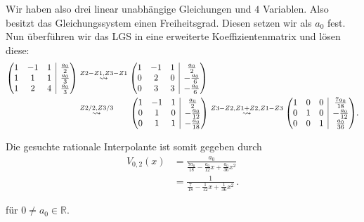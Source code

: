 \documentclass[a4paper]{article}
\makeatletter
\newcommand{\R}{\mathbb{R}}
\newenvironment{amatrix}[1]{%
  \left(\begin{array}{@{}*{#1}{c}|c@{}}
}{%
  \end{array}\right)
}
\makeatother
\begin{document}
    Wir haben also drei linear unabhängige Gleichungen und $4$ Variablen. Also besitzt das Gleichungssystem einen 
    Freiheitsgrad. Diesen setzen wir als $a_0$ fest. Nun überführen wir das LGS in eine erweiterte Koeffizientenmatrix und
    lösen diese:
    \begin{align*}
        \begin{amatrix}{3}
            1 & -1 & 1 & \frac{a_0}{2} \\
            1 & 1  & 1 & \frac{a_0}{3} \\
            1 & 2  & 4 & \frac{a_0}{3}
        \end{amatrix}
        &\stackrel{Z2-Z1, Z3-Z1}{\rightsquigarrow}  
        \begin{amatrix}{3}
            1 & -1 &  1 & \frac{a_0}{2}  \\
            0 &  2 &  0 & -\frac{a_0}{6} \\
            0 &  3 &  3 & -\frac{a_0}{6}
        \end{amatrix} \\
        &\stackrel{Z2/2, Z3/3}{\rightsquigarrow} \hspace*{0.6cm}
        \begin{amatrix}{3}
            1 & -1 &  1 & \frac{a_0}{2}   \\
            0 &  1 &  0 & -\frac{a_0}{12} \\
            0 &  1 &  1 & -\frac{a_0}{18} 
        \end{amatrix} 
        \stackrel{Z3-Z2, Z1+Z2, Z1-Z3}{\rightsquigarrow}
        \begin{amatrix}{3}
            1 &  0 &  0 & \frac{7a_0}{18} \\
            0 &  1 &  0 & -\frac{a_0}{12} \\
            0 &  0 &  1 & \frac{a_0}{36} 
        \end{amatrix}.
    \end{align*}     

    Die gesuchte rationale Interpolante ist somit gegeben durch
    \begin{align*}
        V_{0,2}(x) &= \frac{a_0}{\frac{7a_0}{18} -\frac{a_0}{12}x + \frac{a_0}{36}x^2} \\
                   &= \frac{1}{\frac{7}{18} -\frac{1}{12}x + \frac{1}{36}x^2}\,.
    \end{align*}
    
    für $0 \neq a_0\in\R$.
\end{document}
